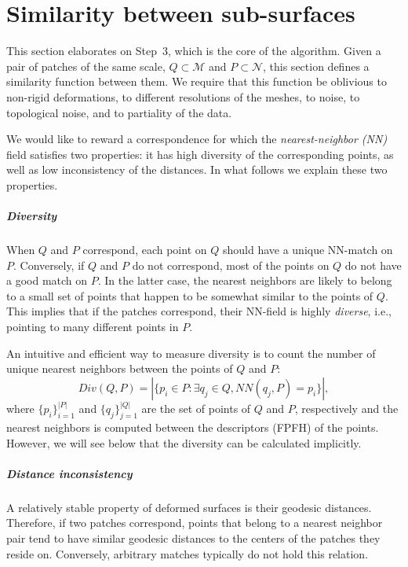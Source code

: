 \chapter{Similarity between sub-surfaces}\label{sec:similarity}


This section elaborates on Step~3, which is the core of the algorithm.
Given a pair of patches of the same scale, $Q \subset \mathcal{M}$ and $P \subset \mathcal{N}$, this section defines a similarity function between them. 
We require that this function be oblivious to non-rigid deformations, to different resolutions of the meshes, to noise, to topological noise, and to partiality of the data.

We would like to reward a correspondence for which the {\em nearest-neighbor (NN)} field satisfies two properties: it has high diversity of the corresponding points, as well as low inconsistency of the distances.
In what follows we explain these two properties.

\paragraph{Diversity}
When $Q$ and $P$ correspond, each point  on $Q$ should have a unique NN-match on $P$.
Conversely, if $Q$ and $P$ do not correspond, most of the points on $Q$  do not have a good match on $P$.
In the latter case, the nearest neighbors are likely to belong to a small set of points that happen to be somewhat similar to the points of $Q$.
This implies that if the patches correspond, their NN-field is highly \textit{diverse}, i.e., pointing to many different points in $P$.

An intuitive and efficient way to measure diversity is to count the number of unique nearest neighbors between the points of  $Q$ and $P$:
\begin{equation}
	\label{eq:diversity}
	Div(Q,P)=|\{p_i\in P:\exists q_j\in Q,NN(q_j,P)=p_i\}|,
\end{equation}
where  $\{p_i\}_{i=1}^{|P|}$ and $\{q_j\}_{j=1}^{|Q|}$ are the set of points of $Q$ and $P$, respectively and the nearest neighbors is computed between the descriptors (FPFH) of the points.
However, we will see below that the diversity can be calculated implicitly.

\paragraph{Distance inconsistency}
A relatively stable property of  deformed surfaces is their geodesic distances.
Therefore, if two patches correspond, points that belong to a nearest neighbor pair tend to have similar geodesic distances to the centers of the patches they reside on.
Conversely, arbitrary matches typically do not hold this relation.

